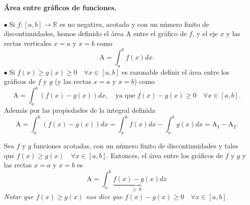 \documentclass{article}
\theoremstyle{definition}
\theoremstyle{remark}
\newcommand\R{\ensuremath{\mathbb{R}}}
\newcommand\bl{$\bullet\;$}
\begin{document}
\begin{center}
\textbf{Área entre gráficos de funciones.}
\end{center}
\bl Si $f : [a,b] \to \R $ es no negativa, acotada y con un número finito de discontinuidades, hemos definido el área A entre el gráfico de $f$, y el eje $x$ y las rectas verticales $x=a$ y $x=b$ como \[
\text{A} = \int_{a}^{b}{f(x)dx}.
\]
\bl Si $f(x) \geq g(x) \geq 0 \quad \forall x \in [a,b] $ es razonable definir el área entre los gráficos de $f$ y $g$ (y las rectas $x=a$ y $x=b$) como \[
\text{A} = \int_{a}^{b}{(f(x)-g(x))dx}, \quad \text{ya que}\; f(x)-g(x) \geq 0 \quad \forall x \in [a,b].
\]
Además por las propiedades de la integral definida \[
\text{A} = \int_{a}^{b}{(f(x)-g(x))dx}=\int_{a}^{b}{f(x)dx}-\int_{a}^{b}{g(x)dx}=\text{A}_1-\text{A}_2.
\]

\begin{figure}[h]
\centering
\def\svgwidth{0.75\textwidth}

\end{figure}
\begin{teo}
  Sea $f$ y $g$ funciones acotadas, con un número finito de discontinuidades y tales que $f(x) \geq g(x) \quad \forall x \in [a,b]$. Entonces, el área entre los gráficos de $f$ y $g$ y las rectas $x=a$ y $x=b$ es \[
\text{A} = \int_{a}^{b}{\underbrace{f(x)-g(x)}_{\geq \; 0}dx}
  \]
\emph{Notar que $f(x) \geq g(x)$ nos dice que $f(x)-g(x)\geq 0 \quad \forall x \in [a,b]$. }
\end{teo}
\end{document}
